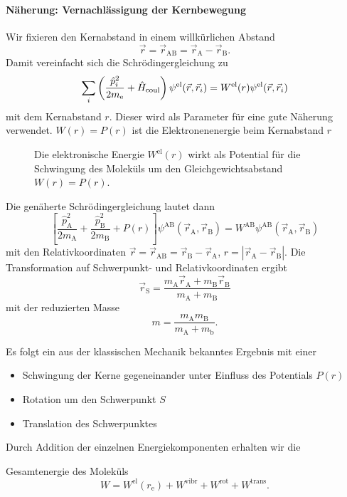 \paragraph{Näherung: Vernachlässigung der Kernbewegung}
	Wir fixieren den Kernabstand in einem willkürlichen Abstand
	$$
	\Vec{r} = \Vec{r}_{\mathrm{AB}} = \Vec{r}_{\mathrm{A}} - \Vec{r}_{\mathrm{B}}.
	$$
	Damit vereinfacht sich die Schrödingergleichung zu 
	\begin{equation}
		\label{eq:4.5}
		\sum_{i} \left( \frac{\hat{p}_{i}^2}{2 m_{\mathrm{e}}} + \hat{H}_{\text{coul}} \right) \psi^{\text{el}} ( \Vec{r}, \Vec{r}_{i}) = W^{\text{el}}(r) \psi^{\text{el}}(\Vec{r}, \Vec{r}_{i})
	\end{equation}
	mit dem Kernabstand $r$. 
	Dieser wird als Parameter für eine gute Näherung verwendet.
	$W(r)=P(r)$ ist die Elektronenenergie beim Kernabstand $r$ 

	\begin{figure}[H]
		\centering
		\label{fig:vl07_abbildung_2}
		\caption{Die elektronische Energie $W^{\text{el}} (r) $ wirkt als Potential für die Schwingung des Moleküls um den Gleichgewichtsabstand $W(r)=P(r)$.}
	\end{figure}
	Die genäherte Schrödingergleichung lautet dann
	\begin{equation}
		\label{eq:4.6}
		\left[  \frac{\hat{p}_{\mathrm{A}}^2}{2 m_{\mathrm{A}}} + \frac{\hat{p}_{\mathrm{B}}^2}{2 m_{\mathrm{B}}} + P(r)  \right] \psi^{\mathrm{AB}} ( \Vec{r}_{\mathrm{A}}, \Vec{r}_{\mathrm{B}}) = W^{\mathrm{AB}} \psi^{\mathrm{AB}} (\Vec{r}_{\mathrm{A}}, \Vec{r}_{\mathrm{B}})
	\end{equation}
	mit den Relativkoordinaten $\Vec{r} = \Vec{r}_{\mathrm{AB}} = \Vec{r}_{\mathrm{B}} - \Vec{r}_{\mathrm{A}}$, $ r = \left| \Vec{r}_{\mathrm{A}} - \Vec{r}_{\mathrm{B}} \right| $. 
	Die Transformation auf Schwerpunkt- und Relativkoordinaten ergibt 
	$$
	\Vec{r}_{\mathrm{S}} = \frac{m_{\mathrm{A}} \Vec{r}_{\mathrm{A}} + m_{\mathrm{B}} \Vec{r}_{\mathrm{B}}}{m_{\mathrm{A}} + m_{\mathrm{B}}}
	$$ 
	mit der reduzierten Masse
	$$
	m = \frac{m_{\mathrm{A}} m_{\mathrm{B}}}{m_{\mathrm{A}} + m_{\mathrm{b}}}.
	$$ 

	Es folgt ein aus der klassischen Mechanik bekanntes Ergebnis mit einer
	\begin{itemize}
		\item Schwingung der Kerne gegeneinander unter Einfluss des Potentials $P(r)$
		\item Rotation um den Schwerpunkt $S$
		\item Translation des Schwerpunktes
	\end{itemize}
	Durch Addition der einzelnen Energiekomponenten erhalten wir die
	\begin{important}
		Gesamtenergie des Moleküls
		\begin{equation}
			\label{eq:4.7}
			W = W^{\text{el}} (r_{\mathrm{e}}) + W^{\text{vibr}} + W^{\text{rot}} + W^{\text{trans}}.
		\end{equation}
	\end{important}
	
